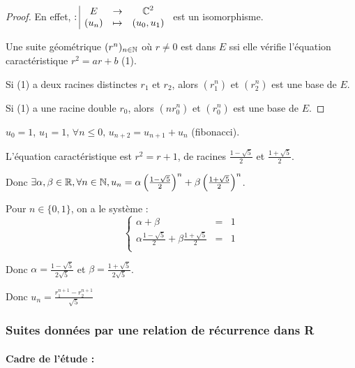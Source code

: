 
\begin{proof}
    En effet, $: \space \begin{array}{|ccc} \displaystyle E & \to & \displaystyle \mathbb{C}^2 \\ \displaystyle (u_n) & \mapsto & \displaystyle (u_0, u_1) \end{array}$ est un isomorphisme. 

    Une suite géométrique $(r^n)_{n \in \mathbb{N}}$ où $r \neq 0$ est dans $E$ ssi elle vérifie
    l'équation caractéristique $r^2 = ar + b$ (1).

    Si (1) a deux racines distinctes $r_1$ et $r_2$, alors $(r_1^n)$ et $(r_2^n)$ est une base de $E$.

    Si (1) a une racine double $r_0$, alors $(nr_0^n)$ et $(r_0^n)$ est une base de $E$.    
\end{proof}

\begin{exemple}
    $u_0 = 1$, $u_1 = 1$, $\forall n \leqslant 0, \, u_{n + 2} = u_{n + 1} + u_n$ (fibonacci).

    L'équation caractéristique est $r^2 = r + 1$, de racines $\frac{1 - \sqrt{5}} 2$ et $\frac{1 + \sqrt{5}} 2$.

    \svspace Donc $\exists \alpha, \beta \in \mathbb{R}, \forall n \in \mathbb{N}, u_n = \alpha \left(\frac{1 - \sqrt{5}} 2\right)^n + \beta \left(\frac{1 + \sqrt{5}} 2\right)^n$.

    Pour $n \in \{0, 1\}$, on a le système :
    $$\left\{
        \begin{array}{rcl}
            \alpha + \beta & = & 1 \\
            \alpha \frac{1 - \sqrt{5}} 2 + \beta \frac{1 + \sqrt{5}} 2 & = & 1 \\
        \end{array}
    \right.$$

    Donc $\alpha = \frac{1 - \sqrt{5}}{2\sqrt{5}}$ et $\beta = \frac{1 + \sqrt{5}}{2\sqrt{5}}$.
    
    Donc $\displaystyle u_n = \frac{r_1^{n + 1} - r_2^{n + 1}}{\sqrt 5}$
\end{exemple}

\subsubsection{Suites données par une relation de récurrence dans R}

\paragraph{Cadre de l'étude :}

